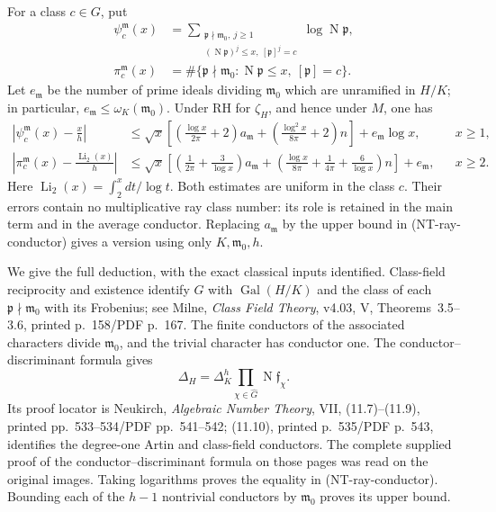 For a class $c\in G$, put
\begin{align*}
 \psi_c^{\mathfrak m}(x)
 &=\sum_{\substack{\mathfrak p\nmid\mathfrak m_0,\ j\ge1\\
           (\operatorname N\mathfrak p)^j\le x,\ [\mathfrak p]^j=c}}
                  \log\operatorname N\mathfrak p,\\
 \pi_c^{\mathfrak m}(x)
 &=\#\{\mathfrak p\nmid\mathfrak m_0:
             \operatorname N\mathfrak p\le x,\ [\mathfrak p]=c\}.
\end{align*}
Let $e_{\mathfrak m}$ be the number of prime ideals dividing
$\mathfrak m_0$ which are unramified in $H/K$; in particular,
$e_{\mathfrak m}\le\omega_K(\mathfrak m_0)$.
Under RH for $\zeta_H$, and hence under $M$, one has
\begin{align*}
 \left|\psi_c^{\mathfrak m}(x)-\frac{x}{h}\right|
 &\le\sqrt x\left[
       \left(\frac{\log x}{2\pi}+2\right)a_{\mathfrak m}
        +\left(\frac{\log^2x}{8\pi}+2\right)n\right]
       +e_{\mathfrak m}\log x,
       &&x\ge1,                                      \tag{NT-C06a}\\
 \left|\pi_c^{\mathfrak m}(x)-\frac{\operatorname{Li}_2(x)}h\right|
 &\le\sqrt x\left[
       \left(\frac1{2\pi}+\frac3{\log x}\right)a_{\mathfrak m}
       +\left(\frac{\log x}{8\pi}+\frac1{4\pi}
                         +\frac6{\log x}\right)n\right]
       +e_{\mathfrak m},
       &&x\ge2.                                      \tag{NT-C06b}
\end{align*}
Here $\operatorname{Li}_2(x)=\int_2^xdt/\log t$.
Both estimates are uniform in the class $c$.
Their errors contain no multiplicative ray class number: its role
is retained in the main term and in the average conductor.
Replacing $a_{\mathfrak m}$ by the upper bound in
(NT-ray-conductor) gives a version using only
$K,\mathfrak m_0,h$.

We give the full deduction, with the exact classical inputs identified.
Class-field reciprocity and existence identify $G$ with
$\operatorname{Gal}(H/K)$ and the class of each
$\mathfrak p\nmid\mathfrak m_0$ with its Frobenius;
see Milne, \emph{Class Field Theory}, v4.03, V, Theorems~3.5--3.6,
printed p.~158/PDF p.~167.  The finite conductors of the associated
characters divide $\mathfrak m_0$, and the trivial character has
conductor one.  The conductor--discriminant formula gives
\[
 \Delta_H=\Delta_K^h
              \prod_{\chi\in\widehat G}
                      \operatorname N\mathfrak f_\chi.
\]
Its proof locator is Neukirch, \emph{Algebraic Number Theory},
VII, (11.7)--(11.9), printed pp.~533--534/PDF pp.~541--542;
(11.10), printed p.~535/PDF p.~543, identifies the degree-one
Artin and class-field conductors.  The complete supplied proof of
the conductor--discriminant formula on those pages was read on
the original images.  Taking logarithms proves the equality in
(NT-ray-conductor).  Bounding each of the $h-1$ nontrivial
conductors by $\mathfrak m_0$ proves its upper bound.

